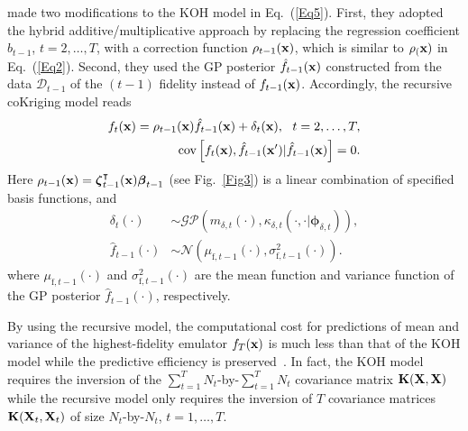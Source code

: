 \documentclass[iicol,sn-basic]{sn-jnl}%
\theoremstyle{thmstyleone}%
\theoremstyle{thmstyletwo}
\theoremstyle{thmstylethree}
\begin{document}
\begin{linenumbers}
\cite{Gratiet2014} made two modifications to the KOH model in Eq.~(\ref{Eq5}).
First, they adopted the hybrid additive/multiplicative approach by replacing the regression coefficient $b_{t-1}$, $t=2,\dots,T$, with a correction function $\rho_{t-1}({\bf x})$, which is similar to $\rho_({\bf x})$ in Eq.~(\ref{Eq2}).
Second, they used the GP posterior $\hat{f}_{t-1}({\bf x})$ constructed from the data $\mathcal{D}_{t-1}$ of the $(t-1)$ fidelity instead of $f_{t-1}({\bf x})$.
Accordingly, the recursive coKriging model reads
\begin{subequations}\label{Eq13}
	\begin{align}
		f_t({\bf x}) =
		\rho_{t-1}({\bf x}) \hat{f}_{t-1}({\bf x}) + \delta_{t}({\bf x}), \ \ t=2,\dots,T \label{Eq13-1},\\
		\text{cov}\left[f_{t}({\bf x}),\hat{f}_{t-1}({\bf x}')|\hat{f}_{t-1}({\bf x})\right]=0 
		\label{Eq13-2}.
	\end{align}
\end{subequations}
Here $\rho_{t-1}({\bf x}) = {\boldsymbol \zeta}_{t-1}^\intercal({\bf x}) {\boldsymbol \beta}_{t-1}$ (see Fig.~\ref{Fig3}) is a linear combination of specified basis functions, and
\begin{subequations}\label{Eq14}
	\begin{align}
		\delta_{t}(\cdot) & \sim \mathcal{GP}\left(m_{\delta,t}(\cdot),\kappa_{\delta,t}(\cdot,\cdot|{\boldsymbol \phi}_{\delta,t})\right)
		\label{Eq14-1},\\
		\hat{f}_{t-1}(\cdot) & \sim \mathcal{N}\left(\mu_{\text{f},t-1}(\cdot),\sigma^2_{\text{f},t-1}(\cdot)\right) 
		\label{Eq14-2}.
	\end{align}
\end{subequations}
where $\mu_{\text{f},t-1}(\cdot)$ and $\sigma^2_{\text{f},t-1}(\cdot)$ are the mean function and variance function of the GP posterior $\hat{f}_{t-1}(\cdot)$, respectively.

By using the recursive model, the computational cost for predictions of mean and variance of the highest-fidelity emulator $f_T({\bf x})$ is much less than that of the KOH model while the predictive efficiency is preserved~\citep{Gratiet2014}.
In fact, the KOH model requires the inversion of the $\sum_{t=1}^{T}N_t$-by-$\sum_{t=1}^{T}N_t$ covariance matrix ${\bf K}({\bf X},{\bf X})$ while the recursive model only requires the inversion of $T$ covariance matrices ${\bf K}({\bf X}_t,{\bf X}_t)$ of size $N_t$-by-$N_t$, $t=1,\dots,T$.


\end{linenumbers}
\end{document}
